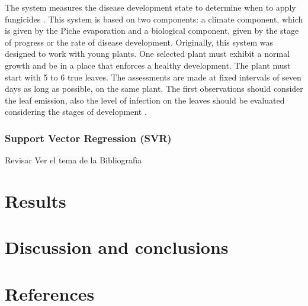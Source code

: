 \documentclass[review]{elsarticle}
\begin{document}
The system measures the disease development state to determine when to apply fungicides \citep{MarinVargas1995}. 
This system is based on two components: a climate component, which is given by the Piche evaporation and a biological component, given by the stage of progress or the rate of disease development. Originally, this system was designed to work with young plants. One selected plant must exhibit a normal growth and be in a place that enforces a healthy development. The plant must start with 5 to 6 true leaves. The assessments are made at fixed intervals of seven days as long as possible, on the same plant. The first observations should consider the leaf emission, also the level of infection on the leaves should be evaluated considering the stages of development \citep{MarinVargas1995}.

\subsubsection{Support Vector Regression (SVR)}

Revisar
Ver el tema de la Bibliografìa





\section{Results}

\section{Discussion and conclusions}

\section{References}
\end{document}
